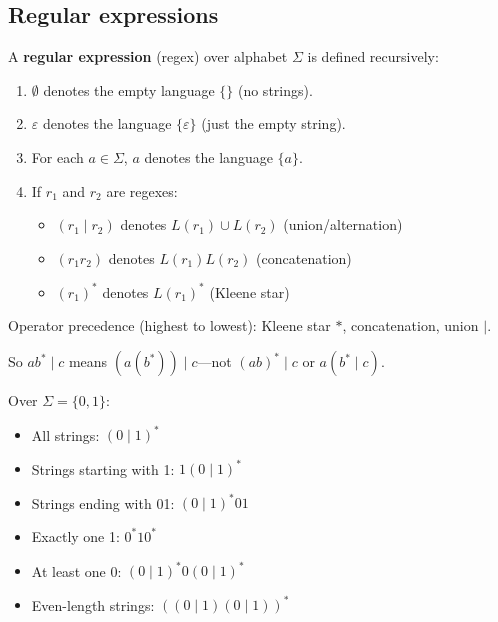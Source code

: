 \subsection*{Regular expressions}

\begin{definition}
A \textbf{regular expression} (regex) over alphabet $\Sigma$ is defined recursively:
\begin{enumerate}
  \item $\emptyset$ denotes the empty language $\{\}$ (no strings).
  \item $\varepsilon$ denotes the language $\{\varepsilon\}$ (just the empty string).
  \item For each $a \in \Sigma$, $a$ denotes the language $\{a\}$.
  \item If $r_1$ and $r_2$ are regexes:
  \begin{itemize}
    \item $(r_1 \mid r_2)$ denotes $L(r_1) \cup L(r_2)$ (union/alternation)
    \item $(r_1 r_2)$ denotes $L(r_1) L(r_2)$ (concatenation)
    \item $(r_1)^*$ denotes $L(r_1)^*$ (Kleene star)
  \end{itemize}
\end{enumerate}
\end{definition}

\begin{definition}[Precedence]
Operator precedence (highest to lowest): Kleene star $*$, concatenation, union $\mid$.

So $ab^*\mid c$ means $(a(b^*))\mid c$---not $(ab)^* \mid c$ or $a(b^* \mid c)$.
\end{definition}

\begin{example}
Over $\Sigma = \{0, 1\}$:
\begin{itemize}
  \item All strings: $(0 \mid 1)^*$
  \item Strings starting with 1: $1(0 \mid 1)^*$
  \item Strings ending with 01: $(0 \mid 1)^*01$
  \item Exactly one 1: $0^*10^*$
  \item At least one 0: $(0 \mid 1)^*0(0 \mid 1)^*$
  \item Even-length strings: $((0 \mid 1)(0 \mid 1))^*$
\end{itemize}
\end{example}


